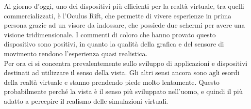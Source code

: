 Al giorno d'oggi, uno dei dispositivi più efficienti per la realtà virtuale, tra quelli commercializzati, è l'Oculus Rift, che permette di vivere esperienze in prima persona grazie ad un visore da indossare, che possiede due schermi per avere una visione tridimensionale.
I commenti di coloro che hanno provato questo dispositivo sono positivi, in quanto la qualità della grafica e del sensore di movimento rendono l'esperienza quasi realistica.\\
Per ora ci si concentra prevalentemente sullo sviluppo di applicazioni e dispositivi destinati ad utilizzare il senso della vista. Gli altri sensi ancora sono agli esordi della realtà virtuale e stanno prendendo piede molto lentamente. Questo probabilmente perché la vista è il senso più sviluppato nell'uomo, e quindi il più adatto a percepire il realismo delle simulazioni virtuali. 






